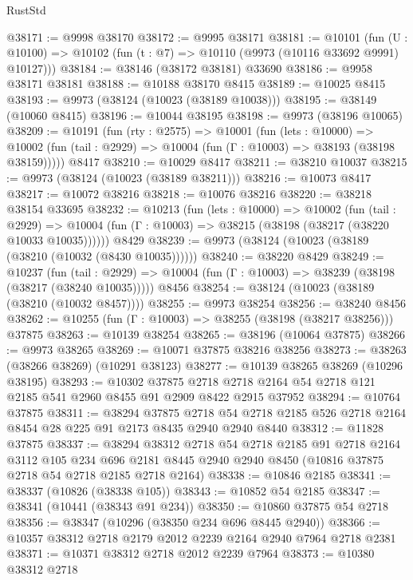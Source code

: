 \begin{lexlean}{RustStd}
\begin{coremodule}
@38171 := @9998 @38170
@38172 := @9995 @38171
@38181 := @10101
    (fun (U : @10100) => @10102 (fun (t : @7) => @10110 (@9973 (@10116 @33692 @9991) @10127)))
@38184 := @38146 (@38172 @38181) @33690
@38186 := @9958 @38171 @38181
@38188 := @10188 @38170 @8415
@38189 := @10025 @8415
@38193 := @9973 (@38124 (@10023 (@38189 @10038)))
@38195 := @38149 (@10060 @8415)
@38196 := @10044 @38195
@38198 := @9973 (@38196 @10065)
@38209 := @10191
    (fun (rty : @2575) =>
    @10001
      (fun (lets : @10000) =>
      @10002 (fun (tail : @2929) => @10004 (fun (Γ : @10003) => @38193 (@38198 @38159)))))
    @8417
@38210 := @10029 @8417
@38211 := @38210 @10037
@38215 := @9973 (@38124 (@10023 (@38189 @38211)))
@38216 := @10073 @8417
@38217 := @10072 @38216
@38218 := @10076 @38216
@38220 := @38218 @38154 @33695
@38232 := @10213
    (fun (lets : @10000) =>
    @10002
      (fun (tail : @2929) =>
      @10004 (fun (Γ : @10003) => @38215 (@38198 (@38217 (@38220 @10033 @10035))))))
    @8429
@38239 := @9973 (@38124 (@10023 (@38189 (@38210 (@10032 (@8430 @10035))))))
@38240 := @38220 @8429
@38249 := @10237
    (fun (tail : @2929) => @10004 (fun (Γ : @10003) => @38239 (@38198 (@38217 (@38240 @10035)))))
    @8456
@38254 := @38124 (@10023 (@38189 (@38210 (@10032 @8457))))
@38255 := @9973 @38254
@38256 := @38240 @8456
@38262 := @10255 (fun (Γ : @10003) => @38255 (@38198 (@38217 @38256))) @37875
@38263 := @10139 @38254
@38265 := @38196 (@10064 @37875)
@38266 := @9973 @38265
@38269 := @10071 @37875 @38216 @38256
@38273 := @38263 (@38266 @38269) (@10291 @38123)
@38277 := @10139 @38265 @38269 (@10296 @38195)
@38293 := @10302
    @37875
    @2718
    @2718
    @2164
    @54
    @2718
    @121
    @2185
    @541
    @2960
    @8455
    @91
    @2909
    @8422
    @2915
    @37952
@38294 := @10764 @37875
@38311 := @38294
    @37875
    @2718
    @54
    @2718
    @2185
    @526
    @2718
    @2164
    @8454
    @28
    @225
    @91
    @2173
    @8435
    @2940
    @2940
    @8440
@38312 := @11828 @37875
@38337 := @38294
    @38312
    @2718
    @54
    @2718
    @2185
    @91
    @2718
    @2164
    @3112
    @105
    @234
    @696
    @2181
    @8445
    @2940
    @2940
    @8450
    (@10816 @37875 @2718 @54 @2718 @2185 @2718 @2164)
@38338 := @10846 @2185
@38341 := @38337 (@10826 (@38338 @105))
@38343 := @10852 @54 @2185
@38347 := @38341 (@10441 (@38343 @91 @234))
@38350 := @10860 @37875 @54 @2718
@38356 := @38347 (@10296 (@38350 @234 @696 @8445 @2940))
@38366 := @10357 @38312 @2718 @2179 @2012 @2239 @2164 @2940 @7964 @2718 @2381
@38371 := @10371 @38312 @2718 @2012 @2239 @7964
@38373 := @10380 @38312 @2718

\end{coremodule}
\end{lexlean}
